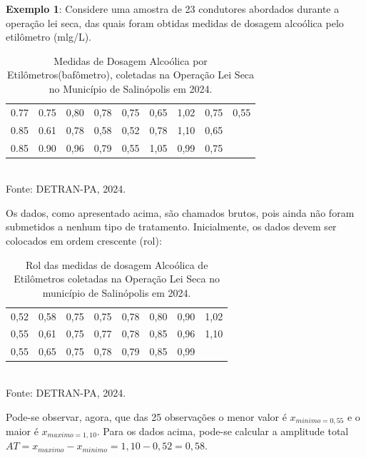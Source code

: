 \newpage
\textbf{Exemplo 1}: Considere uma amostra de 23 condutores abordados durante a operação lei seca, das
quais foram obtidas medidas de dosagem alcoólica pelo etilômetro (mlg/L).\vskip0.3cm

\begin{table}[!htb]
    \centering
    {
    \caption{Medidas de Dosagem Alcoólica por Etilômetros(bafômetro), coletadas na Operação Lei Seca no Município de Salinópolis em 2024.}
    \label{estatura}
    \vspace{0.2cm}
\begin{tabular}{c|c|c|c|c|c|c|c|c}
  \hline\hline
  0.77 & 0.75 & 0,80 & 0,78 & 0,75 & 0,65 & 1,02 & 0,75 & 0,55 \\
  0.85 & 0.61 & 0,78 & 0,58 & 0,52 & 0,78 & 1,10 & 0,65 &    \\
  0.85 & 0.90 & 0,96 & 0,79 & 0,55 & 1,05 & 0,99 & 0,75 &    \\
  \hline\hline
\end{tabular}}
\\
\hspace{-5.5cm}
Fonte: DETRAN-PA, 2024.
\end{table}


Os dados, como apresentado acima, são chamados brutos, pois ainda não foram submetidos a nenhum tipo de tratamento. Inicialmente, os dados devem ser colocados em ordem crescente (rol): \vskip0.3cm


\begin{table}[!htb]
    \centering
    {
    \caption{Rol das medidas de dosagem Alcoólica de Etilômetros coletadas na Operação Lei Seca no município de Salinópolis em 2024.}
    \label{estatura}
    \vspace{0.2cm}
\begin{tabular}{c|c|c|c|c|c|c|c}
  \hline\hline
  0,52 & 0,58 & 0,75 & 0,75 & 0,78 & 0,80 & 0,90 & 1,02 \\
  0,55 & 0,61 & 0,75 & 0,77 & 0,78 & 0,85 & 0,96 & 1,10  \\
  0,55 & 0,65 & 0,75 & 0,78 & 0,79 & 0,85 & 0,99 &     \\
  \hline\hline
\end{tabular}}
\\
\hspace{-4.5cm}
Fonte: DETRAN-PA, 2024.
\end{table}

Pode-se observar, agora, que das 25 observações o menor valor é $x_{minimo = 0,55}$ e o maior é $x_{maximo= 1,10}$. Para os dados acima, pode-se calcular a amplitude total $AT = x_{maximo}-x_{minimo}=1,10-0,52=0,58$. 

